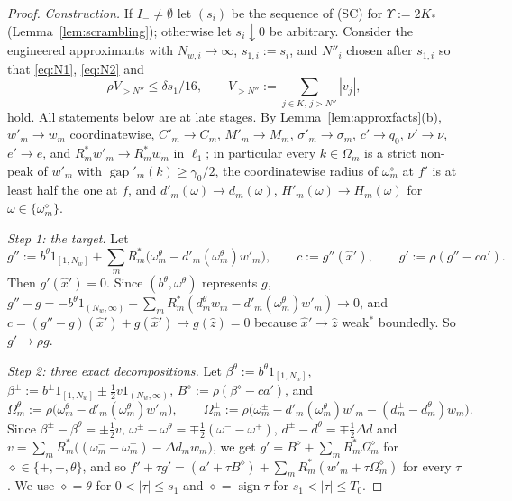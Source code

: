 \documentclass[10pt]{amsart}
\theoremstyle{definition}
\theoremstyle{remark}
\newcommand{\sgn}{\operatorname{sign}}
\newcommand{\gap}{\operatorname{gap}}
\newcommand{\zh}{\hat z}
\begin{document}
\begin{proof}
\emph{Construction.}  If $I_-\ne\emptyset$ let $(s_i)$ be the sequence of
\textup{(SC)} for $\Upsilon:=2K_*$ (Lemma~\ref{lem:scrambling}); otherwise let
$s_i\downarrow0$ be arbitrary.  Consider the engineered approximants with
$N_{w,i}\to\infty$, $s_{1,i}:=s_i$, and $N''_i$ chosen after $s_{1,i}$ so that
\eqref{eq:N1}, \eqref{eq:N2} and
\begin{equation}\label{eq:N3}
 \rho V_{>N''}\le\delta s_1/16,\qquad V_{>N''}:=\sum_{j\in K,\,j>N''}|v_j|,
\end{equation}
hold.  All statements below are at late stages.  By
Lemma~\ref{lem:approxfacts}(b), $w'_m\to w_m$ coordinatewise, $C'_m\to C_m$,
$M'_m\to M_m$, $\sigma'_m\to\sigma_m$, $c'\to q_0$, $\nu'\to\nu$, $e'\to e$,
and $R^*_mw'_m\to R_m^*w_m$ in $\ell_1$; in particular every $k\in\Omega_m$
is a strict non-peak of $w'_m$ with $\gap'_m(k)\ge\gamma_0/2$, the
coordinatewise radius of $\omega^\diamond_m$ at $f'$ is at least half the one
at $f$, and $d'_m(\omega)\to d_m(\omega)$, $H'_m(\omega)\to H_m(\omega)$ for
$\omega\in\{\omega^\diamond_m\}$.

\emph{Step 1: the target.}  Let
\[
 g'':=b^\theta1_{[1,N_w]}+\sum_mR_m^*\big(\omega^\theta_m-d'_m(\omega^\theta_m)
 w'_m\big),\qquad c:=g''(\hat x'),\qquad g':=\rho(g''-ca').
\]
Then $g'(\hat x')=0$.  Since $(b^\theta,\omega^\theta)$ represents $g$,
$g''-g=-b^\theta1_{(N_w,\infty)}+\sum_mR_m^*(d^\theta_mw_m-d'_m(\omega^\theta_m)
w'_m)\to0$, and $c=(g''-g)(\hat x')+g(\hat x')\to g(\zh)=0$ because $\hat
x'\to\zh$ weak$^*$ boundedly.  So $g'\to\rho g$.

\emph{Step 2: three exact decompositions.}  Let
$\beta^\theta:=b^\theta1_{[1,N_w]}$, $\beta^\pm:=b^\pm1_{[1,N_w]}\pm\frac12v
1_{(N_w,\infty)}$, $B^\diamond:=\rho(\beta^\diamond-ca')$, and
\[
 \Omega^\theta_m:=\rho\big(\omega^\theta_m-d'_m(\omega^\theta_m)w'_m\big),\qquad
 \Omega^\pm_m:=\rho\big(\omega^\pm_m-d'_m(\omega^\theta_m)w'_m-(d^\pm_m-
 d^\theta_m)w_m\big).
\]
Since $\beta^\pm-\beta^\theta=\pm\frac12v$, $\omega^\pm-\omega^\theta=
\mp\frac12(\omega^--\omega^+)$, $d^\pm-d^\theta=\mp\frac12\Delta d$ and
$v=\sum_mR_m^*\big((\omega^-_m-\omega^+_m)-\Delta d_mw_m\big)$, we get
$g'=B^\diamond+\sum_mR^*_m\Omega^\diamond_m$ for $\diamond\in\{+,-,\theta\}$, and
so $f'+\tau g'=(a'+\tau B^\diamond)+\sum_mR^*_m(w'_m+\tau\Omega^\diamond_m)$ for
every $\tau$.  We use $\diamond=\theta$ for $0<|\tau|\le s_1$ and
$\diamond=\sgn\tau$ for $s_1<|\tau|\le T_0$.


\end{proof}
\end{document}
